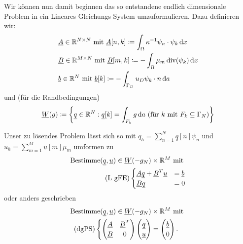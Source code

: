 Wir können nun damit beginnen das so entstandene endlich dimensionale Problem in ein Lineares Gleichungs System umzuformulieren. Dazu definieren wir:
	\begin{align*}
	&\underline{A} \in \mathbb{R}^{N \times N} \text{ mit } \underline{A}[n,k] \coloneqq \int_{\Omega} \kappa^{-1} \psi_n \cdot \psi_k \, \mathrm{d} x \\
	&\underline{B} \in \mathbb{R}^{M \times N} \text{ mit } \underline{B}[m,k] \coloneqq - \int_{\Omega} \mu_m \operatorname{div}(\psi_k) \, \mathrm{d} x \\
	&\underline{b} \in \mathbb{R}^N \text{ mit } \underline{b}[k] \coloneqq - \int_{\Gamma_D} u_D \psi_k \cdot n \, \mathrm{d} a
	\end{align*}
	und (für die Randbedingungen)
	\begin{align*}
	\underline{W}(g) \coloneqq \left\{ \underline{q} \in \mathbb{R}^N : \underline{q}[k] = \int_{F_k} g  \, \mathrm{d} a \ (\text{für } k \text{ mit } F_k \subseteq \Gamma_N) \right\} 
	\end{align*}


Unser zu lösendes Problem lässt sich so mit $ q_h = \sum_{n=1}^{N} \underline{q}[n] \psi_n $ und $ u_h = \sum_{m=1}^{M} \underline{u}[m] \mu_m $ umformen zu 
\begin{align*}
\text{Bestimme} (\underline{q},\underline{u}) \in \underline{W}(-g_N)\times \mathbb{R}^M \text{ mit }\\
\text{(L gFE)}\begin{cases}
\underline{A} \underline{q} + \underline{B}^T \underline{u} &= \underline{b} \\
\underline{B} \underline{q} &= 0
\end{cases}
\end{align*}
oder anders geschrieben 
\begin{align*}
\text{Bestimme} (\underline{q},\underline{u}) \in \underline{W}(-g_N)\times \mathbb{R}^M \text{ mit }\\
\text{(dgPS)}\begin{cases}
\begin{pmatrix}
\underline{A} &\underline{B}^T\\
\underline{B} &0
\end{pmatrix}
\begin{pmatrix}
\underline{q} \\
\underline{u} 
\end{pmatrix}
=
\begin{pmatrix}
\underline{b}\\
0
\end{pmatrix}.
\end{cases}
\end{align*}

